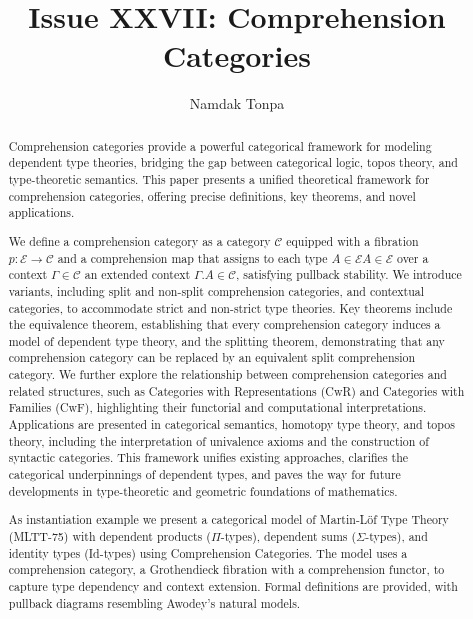 \documentclass{article}
\begin{document}
\title{Issue XXVII: Comprehension Categories}
\author{Namdak Tonpa}
\date{}


\maketitle

\begin{abstract}
Comprehension categories provide a powerful categorical framework for modeling dependent
type theories, bridging the gap between categorical logic, topos theory, and type-theoretic
semantics. This paper presents a unified theoretical framework for comprehension categories,
offering precise definitions, key theorems, and novel applications.

We define a comprehension
category as a category $\mathcal{C}$
equipped with a fibration $p: \mathcal{E} \to \mathcal{C}$
and a comprehension map that assigns to each type $A \in \mathcal{E}A \in \mathcal{E}$
over a context $\Gamma \in \mathcal{C}$
an extended context $\Gamma.A \in \mathcal{C}$,
satisfying pullback stability. We introduce variants, including split and
non-split comprehension categories, and contextual categories, to accommodate
strict and non-strict type theories. Key theorems include the equivalence theorem,
establishing that every comprehension category induces a model of dependent type theory,
and the splitting theorem, demonstrating that any comprehension category can be replaced
by an equivalent split comprehension category. We further explore the relationship
between comprehension categories and related structures, such as Categories with
Representations (CwR) and Categories with Families (CwF), highlighting their
functorial and computational interpretations. Applications are presented in
categorical semantics, homotopy type theory, and topos theory, including the
interpretation of univalence axioms and the construction of syntactic categories.
This framework unifies existing approaches, clarifies the categorical
underpinnings of dependent types, and paves the way for future developments
in type-theoretic and geometric foundations of mathematics.

As instantiation example we present a categorical model of Martin-Löf Type Theory (MLTT-75)
with dependent products ($\Pi$-types), dependent sums ($\Sigma$-types),
and identity types (Id-types) using Comprehension Categories.
The model uses a comprehension category, a Grothendieck fibration
with a comprehension functor, to capture type dependency and context extension.
Formal definitions are provided, with pullback diagrams resembling Awodey’s natural models.
\end{abstract}
\end{document}
